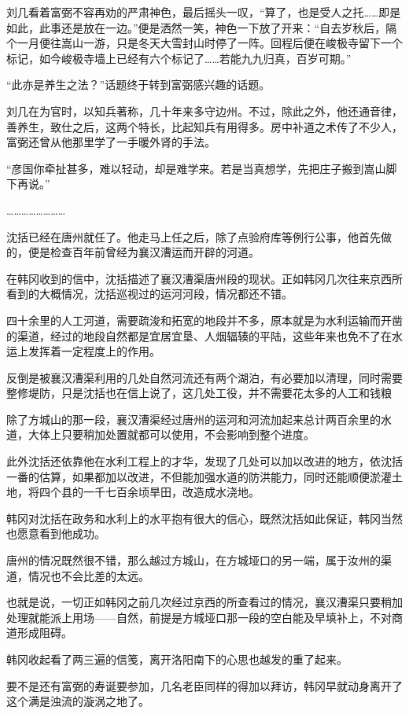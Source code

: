 刘几看着富弼不容再劝的严肃神色，最后摇头一叹，“算了，也是受人之托……即是如此，此事还是放在一边。”便是洒然一笑，神色一下放了开来：“自去岁秋后，隔个一月便往嵩山一游，只是冬天大雪封山时停了一阵。回程后便在峻极寺留下一个标记，如今峻极寺墙上已经有六个标记了……若能九九归真，百岁可期。”

“此亦是养生之法？”话题终于转到富弼感兴趣的话题。

刘几在为官时，以知兵著称，几十年来多守边州。不过，除此之外，他还通音律，善养生，致仕之后，这两个特长，比起知兵有用得多。房中补道之术传了不少人，富弼还曾从他那里学了一手暖外肾的手法。

“彦国你牵扯甚多，难以轻动，却是难学来。若是当真想学，先把庄子搬到嵩山脚下再说。”

……………………

沈括已经在唐州就任了。他走马上任之后，除了点验府库等例行公事，他首先做的，便是检查百年前曾经为襄汉漕运而开辟的河道。

在韩冈收到的信中，沈括描述了襄汉漕渠唐州段的现状。正如韩冈几次往来京西所看到的大概情况，沈括巡视过的运河河段，情况都还不错。

四十余里的人工河道，需要疏浚和拓宽的地段并不多，原本就是为水利运输而开凿的渠道，经过的地段自然都是宜居宜垦、人烟辐辏的平陆，这些年来也免不了在水运上发挥着一定程度上的作用。

反倒是被襄汉漕渠利用的几处自然河流还有两个湖泊，有必要加以清理，同时需要整修堤防，只是沈括也在信上说了，这几处工役，并不需要花太多的人工和钱粮

除了方城山的那一段，襄汉漕渠经过唐州的运河和河流加起来总计两百余里的水道，大体上只要稍加处置就都可以使用，不会影响到整个进度。

此外沈括还依靠他在水利工程上的才华，发现了几处可以加以改进的地方，依沈括一番的估算，如果都加以改进，不但能加强水道的防洪能力，同时还能顺便淤灌土地，将四个县的一千七百余顷旱田，改造成水浇地。

韩冈对沈括在政务和水利上的水平抱有很大的信心，既然沈括如此保证，韩冈当然也愿意看到他成功。

唐州的情况既然很不错，那么越过方城山，在方城垭口的另一端，属于汝州的渠道，情况也不会比差的太远。

也就是说，一切正如韩冈之前几次经过京西的所查看过的情况，襄汉漕渠只要稍加处理就能派上用场——自然，前提是方城垭口那一段的空白能及早填补上，不对商道形成阻碍。

韩冈收起看了两三遍的信笺，离开洛阳南下的心思也越发的重了起来。

要不是还有富弼的寿诞要参加，几名老臣同样的得加以拜访，韩冈早就动身离开了这个满是浊流的漩涡之地了。

